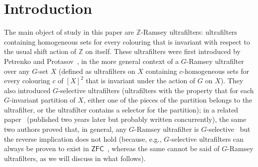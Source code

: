 \documentclass{amsart}
\theoremstyle{definition}
\theoremstyle{remark}
\numberwithin{equation}{section}
\begin{document}
\begin{abstract}
We study \(\mathbb{Z}\)-Ramsey ultrafilters, ultrafilters containing witnesses to every shift-invariant instance of Ramsey's theorem. We prove that it is consistent that there are no $\mathbb Z$-Ramsey ultrafilters. We also prove that every \((\mathbb{Z},3)\)-Ramsey ultrafilter, as well as every \(\mathbb{Z}\)-Ramsey P-point, is selective. Further, we exhibit a generic extension—using quotient algebras of the form \(\mathcal{P}(\mathbb{Z})/\mathcal{I}\) for certain \(F_{\sigma }\)-ideals—that contains P-points that are not \(\mathbb{Z}\)-Ramsey ultrafilters, thereby addressing open questions raised by Petrenko and Protasov ~\cite{MR3376354,MR3681104}.
\end{abstract}

\maketitle

\section{ Introduction}

The main object of study in this paper are $\mathbb Z$-Ramsey ultrafilters: ultrafilters containing homogeneous sets for every colouring that is invariant with respect to the usual shift action of $\mathbb Z$ on itself. These ultrafilters were first introduced by Petrenko and Protasov~\cite{MR3376354}, in the more general context of a $G$-Ramsey ultrafilter over any $G$-set $X$ (defined as ultrafilters on $X$ containing $c$-homogeneous sets for every colouring $c$ of $[X]^2$ that is invariant under the action of $G$ on $X$). They also introduced $G$-selective ultrafilters (ultrafilters with the property that for each $G$-invariant partition of $X$, either one of the pieces of the partition belongs to the ultrafilter, or the ultrafilter contains a selector for the partition); in a related paper~\cite{MR3681104} (published two years later but probably written concurrently), the same two authors proved that, in general, any $G$-Ramsey ultrafilter is $G$-selective~\cite[Theorem 5.3]{MR3681104} but the reverse implication does not hold (because, e.g., $G$-selective ultrafilters can always be proven to exist in $\mathsf{ZFC}$~\cite[Theorem 5.1]{MR3681104}, whereas the same cannot be said of $G$-Ramsey ultrafilters, as we will discuss in what follows).
\end{document}
